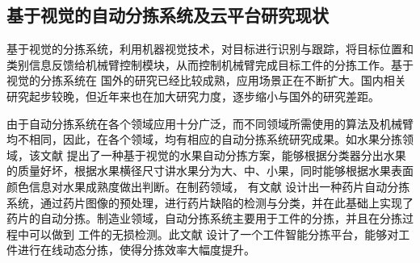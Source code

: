 \subsection{基于视觉的自动分拣系统及云平台研究现状}


基于视觉的分拣系统，利用机器视觉技术，对目标进行识别与跟踪，将目标位置和类别信息反馈给机械臂控制模块，从而控制机械臂完成目标工件的分拣工作。基于视觉的分拣系统在
国外的研究已经比较成熟，应用场景正在不断扩大。国内相关研究起步较晚，但近年来也在加大研究力度，逐步缩小与国外的研究差距。

由于自动分拣系统在各个领域应用十分广泛，而不同领域所需使用的算法及机械臂均不相同，因此，在各个领域，均有相应的自动分拣系统研究成果。如水果分拣领域，该文献  \cite{DT:2018}
提出了一种基于视觉的水果自动分拣方案，能够根据分类器分出水果的质量好坏，根据水果横径尺寸讲水果分为大、中、小果，同时能够根据水果表面颜色信息对水果成熟度做出判断。在制药领域，
有文献  \cite{YP2017}
设计出一种药片自动分拣系统，通过药片图像的预处理，进行药片缺陷的检测与分类，并在此基础上实现了药片的自动分拣。制造业领域，自动分拣系统主要用于工件的分拣，并且在分拣过程中可以做到
工件的无损检测。此文献  \cite{GJ2017}
设计了一个工件智能分拣平台，能够对工件进行在线动态分拣，使得分拣效率大幅度提升。

